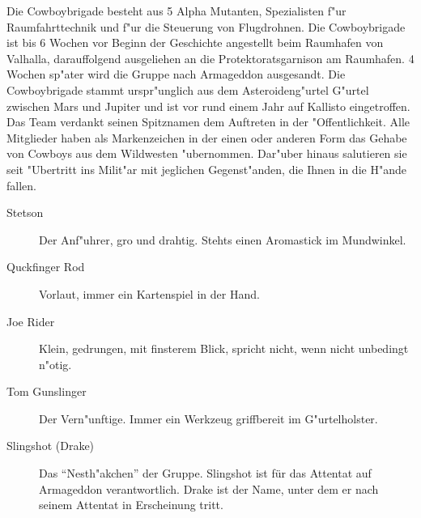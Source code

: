 
Die Cowboybrigade besteht aus 5 Alpha Mutanten, Spezialisten f"ur Raumfahrttechnik und f"ur die Steuerung von Flugdrohnen. 
Die Cowboybrigade ist bis 6 Wochen vor Beginn der Geschichte angestellt beim Raumhafen von Valhalla, darauffolgend ausgeliehen an die Protektoratsgarnison am Raumhafen. 4 Wochen sp"ater wird die Gruppe nach Armageddon
ausgesandt. Die Cowboybrigade stammt urspr"unglich aus dem Asteroideng"urtel G"urtel zwischen Mars und Jupiter und ist 
vor rund einem Jahr auf Kallisto eingetroffen. Das Team verdankt seinen Spitznamen dem Auftreten in der "Offentlichkeit. Alle Mitglieder haben als Markenzeichen in der einen oder anderen Form das Gehabe von Cowboys aus dem Wildwesten  "ubernommen. Dar"uber hinaus salutieren sie seit "Ubertritt ins Milit"ar mit jeglichen Gegenst"anden, die Ihnen in die H"ande fallen.

\begin{description}
    \item[Stetson] Der Anf"uhrer, gro\3 und drahtig. Stehts einen Aromastick im Mundwinkel.
    \item[Quckfinger Rod] Vorlaut, immer ein Kartenspiel in der Hand.
    \item[Joe Rider] Klein, gedrungen, mit finsterem Blick, spricht nicht, wenn nicht unbedingt n"otig.
    \item[Tom Gunslinger] Der Vern"unftige. Immer ein Werkzeug griffbereit im G"urtelholster. 
    \item[Slingshot (Drake)] Das "`Nesth"akchen"' der Gruppe. Slingshot ist für das Attentat auf Armageddon verantwortlich. 
        Drake ist der Name, unter dem er nach seinem Attentat in Erscheinung tritt.
\end{description}

\newpage
